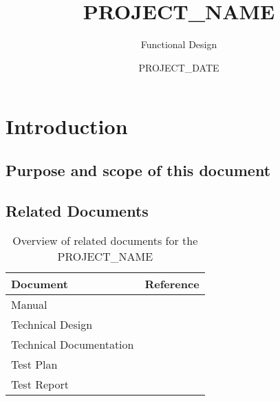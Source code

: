 \documentclass[signature]{deltares_report}
\begin{document}
\pagestyle{empty}
\cleardoublepage
%

\newcommand{\ProgramName}{PROJECT_NAME\xspace}

\title{\ProgramName}
\subtitle{Functional Design}
\classification{-}

\date{PROJECT_DATE}



\summary{}

\revieweri{}
\approvali{}

\disclaimer{}

\deltarestitle


\chapter{Introduction} 
\label{chapterIntroduction}

\section{Purpose and scope of this document} \label{sec:PurposeAndScope}

\section{Related Documents}
\label{sec:RelatedDocuments}
\bigskip
\begin{longtable}{|p{}|p{}|}
\caption{Overview of related documents for the \ProgramName \label{tab:RelatedDocuments}}\\	\hline
		\hline 
		\textbf{Document} & \textbf{Reference} \\
		\hline 
		\hline 
		Manual & \citep{PROJECT_NAME_ManualPROJECT_YEAR} \\
		Technical Design & \citep{PROJECT_NAME_TechnicalDesignPROJECT_YEAR} \\
		Technical Documentation & \citep{PROJECT_NAME_TechnicalDocumentationPROJECT_YEAR} \\
		Test Plan & \citep{PROJECT_NAME_TestPlanPROJECT_YEAR} \\
		Test Report & \citep{PROJECT_NAME_TestReportPROJECT_YEAR} \\
    \hline			
\end{longtable}
\end{document}
